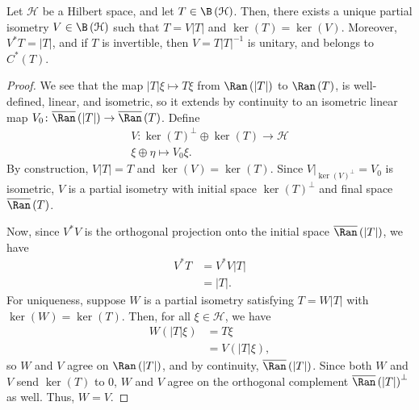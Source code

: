 \documentclass[10pt]{mypackage}
\begin{document}
\begin{proposition}
  Let $\mathcal{H}$ be a Hilbert space, and let $T\in \B\left( \mathcal{H} \right)$. Then, there exists a unique partial isometry $V\in \B\left( \mathcal{H} \right)$ such that $T = V\left\vert T \right\vert$ and $\ker\left( T \right) = \ker\left( V \right)$. Moreover, $V^{\ast}T = \left\vert T \right\vert$, and if $T$ is invertible, then $V = T\left\vert T \right\vert^{-1}$ is unitary, and belongs to $C^{\ast}\left( T \right)$.
\end{proposition}
\begin{proof}
  We see that the map $\left\vert T \right\vert\xi \mapsto T\xi$ from $\Ran\left( \left\vert T \right\vert \right)$ to $\Ran\left( T \right)$, is well-defined, linear, and isometric, so it extends by continuity to an isometric linear map $V_0\colon \overline{\Ran}\left( \left\vert T \right\vert \right)\rightarrow \overline{\Ran}\left( T \right)$. Define
  \begin{align*}
    V\colon \ker\left( T \right)^{\perp}\oplus \ker\left( T \right)\rightarrow \mathcal{H}\\
    \xi\oplus \eta \mapsto V_0\xi.
  \end{align*}
  By construction, $V\left\vert T \right\vert = T$ and $\ker\left( V \right) = \ker\left( T \right)$. Since $V|_{\ker\left( V \right)^{\perp}} = V_0$ is isometric, $V$ is a partial isometry with initial space $\ker\left( T \right)^{\perp}$ and final space $\overline{\Ran}\left( T \right)$.\newline

  Now, since $V^{\ast}V$ is the orthogonal projection onto the initial space $\overline{\Ran}\left( \left\vert T \right\vert \right)$, we have
  \begin{align*}
    V^{\ast}T &= V^{\ast}V\left\vert T \right\vert\\
              &= \left\vert T \right\vert.
  \end{align*}
  For uniqueness, suppose $W$ is a partial isometry satisfying $T = W\left\vert T \right\vert$ with $\ker\left( W \right) = \ker\left( T \right)$. Then, for all $\xi\in \mathcal{H}$, we have
  \begin{align*}
    W\left( \left\vert T \right\vert\xi \right) &= T\xi\\
                                                &= V\left( \left\vert T \right\vert\xi \right),
  \end{align*}
  so $W$ and $V$ agree on $\Ran\left( \left\vert T \right\vert \right)$, and by continuity, $\overline{\Ran}\left( \left\vert T \right\vert \right)$. Since both $W$ and $V$ send $\ker\left( T \right)$ to $0$, $W$ and $V$ agree on the orthogonal complement $\overline{\Ran}\left( \left\vert T \right\vert \right)^{\perp}$ as well. Thus, $W = V$.\newline


\end{proof}
\end{document}
